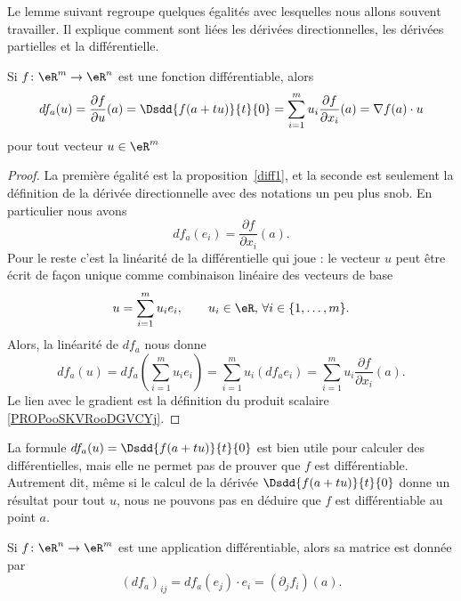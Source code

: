 Le lemme suivant regroupe quelques égalités avec lesquelles nous allons souvent travailler. Il explique comment sont liées les dérivées directionnelles, les dérivées partielles et la différentielle.
\begin{lemma}		\label{LemdfaSurLesPartielles}
	Si \( f\colon \eR^m\to \eR^n\) est une fonction différentiable, alors
	\begin{equation}
		df_a(u)=\frac{ \partial f }{ \partial u }(a)=\Dsdd{ f(a+tu) }{t}{0}=\sum_{i=1}^mu_i\frac{ \partial f }{ \partial x_i }(a)=\nabla f(a)\cdot u
	\end{equation}
	pour tout vecteur \( u\in\eR^m\)
\end{lemma}

\begin{proof}
	La première égalité est la proposition~\ref{diff1}, et la seconde est seulement la définition de la dérivée directionnelle avec des notations un peu plus snob. En particulier nous avons
	\begin{equation}
		df_a(e_i)=\frac{ \partial f }{ \partial x_i }(a).
	\end{equation}
	Pour le reste c'est la linéarité de la différentielle qui joue : le vecteur \( u\) peut être écrit de façon unique comme combinaison linéaire des vecteurs de base
	\[
		u=\sum_{i=1}^{m}u_i e_i, \qquad  u_i\in\eR,\, \forall i\in\{1,\ldots, m\}.
	\]
	Alors, la linéarité de \( df_a\) nous donne
	\begin{equation}
		df_a(u)= df_a\left(\sum_{i=1}^{m}u_i e_i\right)
		=\sum_{i=1}^{m}u_i \left(df_ae_i\right)
		=\sum_{i=1}^{m}u_i \frac{ \partial f }{ \partial x_i }(a).
	\end{equation}
	Le lien avec le gradient est la définition du produit scalaire \eqref{PROPooSKVRooDGVCYj}.
\end{proof}

La formule \( df_a(u)=\Dsdd{ f(a+tu) }{t}{0}\) est bien utile pour calculer des différentielles, mais elle ne permet pas de prouver que \( f\) est différentiable. Autrement dit, même si le calcul de la dérivée \( \Dsdd{ f(a+tu) }{t}{0}\) donne un résultat pour tout \( u\), nous ne pouvons pas en déduire que \( f\) est différentiable au point \( a\).

\begin{proposition}	\label{PROPooJMBJooQzjXYf}
	Si \(f \colon \eR^n\to \eR^m  \) est une application différentiable, alors sa matrice est donnée par
	\begin{equation}
		(df_a)_{ij}=df_a(e_j)\cdot e_i=(\partial_jf_i)(a).
	\end{equation}
\end{proposition}

